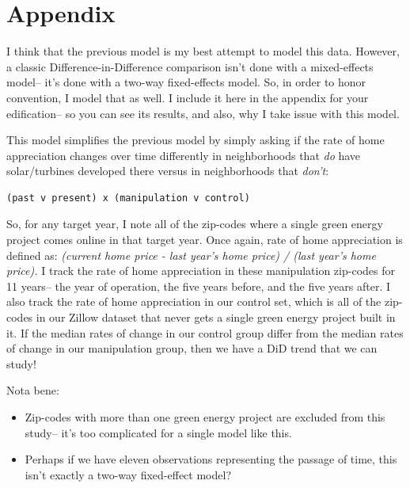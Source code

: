 \documentclass{article}
\begin{document}
\section{Appendix}

I think that the previous model is my best attempt to model this data.
However, a classic Difference-in-Difference comparison isn't done with a mixed-effects model-- it's done with a two-way fixed-effects model.
So, in order to honor convention, I model that as well.
I include it here in the appendix for your edification-- so you can see its results, and also, why I take issue with this model.

This model simplifies the previous model by simply asking if the rate of home appreciation changes over time differently in neighborhoods that \emph{do} have solar/turbines developed there versus in neighborhoods that \emph{don't}:
\begin{verbatim}
(past v present) x (manipulation v control)
\end{verbatim}

So, for any target year, I note all of the zip-codes where a single green energy project comes online in that target year.
Once again, rate of home appreciation is defined as:
\noindent\textit{(current home price - last year's home price) / (last year's home price). }
I track the rate of home appreciation in these manipulation zip-codes for 11 years-- the year of operation, the five years before, and the five years after.
I also track the rate of home appreciation in our control set, which is all of the zip-codes in our Zillow dataset that never gets a single green energy project built in it.
If the median rates of change in our control group differ from the median rates of change in our manipulation group, then we have a DiD trend that we can study!

Nota bene:
\begin{itemize}
\item Zip-codes with more than one green energy project are excluded from this study-- it's too complicated for a single model like this.
\item Perhaps if we have eleven observations representing the passage of time, this isn't exactly a two-way fixed-effect model?
\end{itemize}
\end{document}

